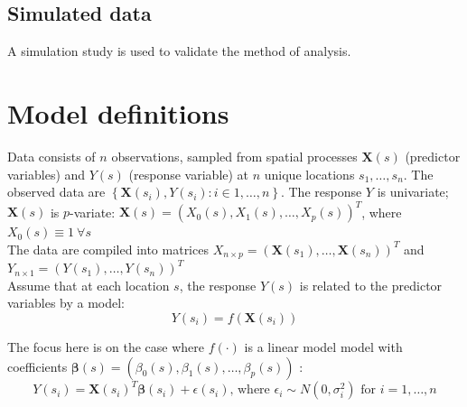 \documentclass[authoryear ,review]{elsarticle}
\newcommand{\vect}[1]{\boldsymbol{#1}}
\begin{document}
	\subsection{Simulated data}
		A simulation study is used to validate the method of analysis.\\
	
\section{Model definitions}
	
	Data consists of $n$ observations, sampled from spatial processes $\vect{X}(s)$ (predictor variables) and $Y(s)$ (response variable) at $n$ unique locations $s_1, \dots, s_n$. The observed data are $\left\{ \vect{X}(s_i) , Y(s_i) : i \in 1, \dots, n \right\}$. The response $Y$ is univariate; $\vect{X}(s)$ is $p$-variate: $\vect{X}(s) = (X_0(s), X_1(s), \dots, X_p(s))^T$, where $X_0(s) \equiv 1 \: \forall s$ \\
	
	The data are compiled into matrices $X_{n \times p} = \left( \vect{X}(s_1), \dots, \vect{X}(s_n) \right)^T$ and $Y_{n \times 1} = \left(Y(s_1), \dots, Y(s_n) \right)^T$\\
		
	Assume that at each location $s$, the response $Y(s)$ is related to the predictor variables by a model:\\
	
	\[
		Y(s_i) = f \left(\vect{X}(s_i) \right) %
	\]
	
	The focus here is on the case where $f(\cdot)$ is a linear model model with coefficients $\vect{\beta}(s) = (\beta_0(s), \beta_1(s), \dots, \beta_p(s))$ :\\
	\[
		Y(s_i) = \vect{X}(s_i)^T \vect{\beta}(s_i) + \epsilon(s_i) \text{, where } \epsilon_i \sim N\left( 0, \sigma_i^2 \right) \text{ for } i=1, \dots, n
	\]
	
\end{document}
